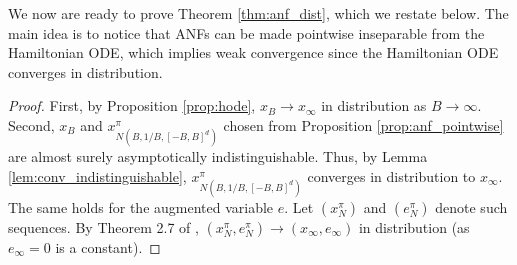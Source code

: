 \documentclass{article}
\begin{document}
We now are ready to prove Theorem \ref{thm:anf_dist}, which we restate below.
The main idea is to notice that ANFs can be made pointwise inseparable from the Hamiltonian ODE, which implies weak convergence since the Hamiltonian ODE converges in distribution. 
\anfdist*
\begin{proof}
First, by Proposition \ref{prop:hode}, $x_B\rightarrow x_\infty$ in distribution as $B\rightarrow\infty$. 
Second, $x_{B}$ and $x^\pi_{N(B,1/B,[-B,B]^d)}$ chosen from Proposition \ref{prop:anf_pointwise} are almost surely asymptotically indistinguishable.
Thus, by Lemma \ref{lem:conv_indistinguishable}, $x^\pi_{N(B,1/B,[-B,B]^d)}$ converges in distribution to $x_\infty$.
The same holds for the augmented variable $e$. 
Let $(x^\pi_N)$ and $(e^\pi_N)$ denote such sequences. 
By Theorem 2.7 of \citet{van2000asymptotic}, $(x^\pi_N,e^\pi_N)\rightarrow(x_\infty,e_\infty)$ in distribution (as $e_\infty=0$ is a constant).
\end{proof}
\end{document}

